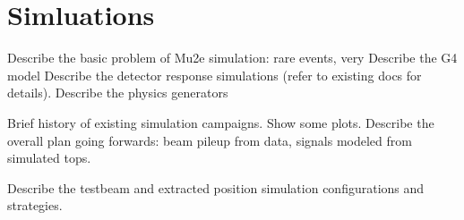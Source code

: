 \section{Simluations}
\label{sec:simulation}
Describe the basic problem of Mu2e simulation: rare events, very
Describe the G4 model
Describe the detector response simulations (refer to existing docs for details).
Describe the physics generators

Brief history of existing simulation campaigns.  Show some plots.
Describe the overall plan going forwards: beam pileup from data, signals modeled from simulated tops.

Describe the testbeam and extracted position simulation configurations and strategies.

